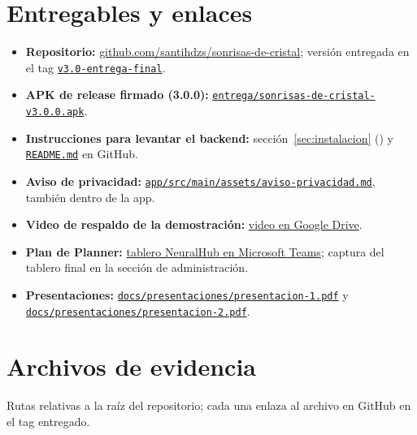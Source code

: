 \section{Entregables y enlaces}\label{sec:entregables}
\newcommand{\gh}{https://github.com/santihdzs/sonrisas-de-cristal}
\begin{itemize}
	\item \textbf{Repositorio:} \href{\gh}{github.com/santihdzs/sonrisas-de-cristal}; versión entregada en el tag \href{\gh/tree/v3.0-entrega-final}{\texttt{v3.0-entrega-final}}.
	\item \textbf{APK de release firmado (3.0.0):} \href{\gh/raw/v3.0-entrega-final/entrega/sonrisas-de-cristal-v3.0.0.apk}{\texttt{entrega/sonrisas-de-cristal-v3.0.0.apk}}.
	\item \textbf{Instrucciones para levantar el backend:} sección~\ref{sec:instalacion} () y \href{\gh/blob/v3.0-entrega-final/README.md}{\texttt{README.md}} en GitHub.
	\item \textbf{Aviso de privacidad:} \href{\gh/blob/v3.0-entrega-final/app/src/main/assets/aviso-privacidad.md}{\texttt{app/src/main/assets/aviso-privacidad.md}}, también dentro de la app.
	\item \textbf{Video de respaldo de la demostración:} \href{https://drive.google.com/file/d/12scqGtx0UNwZK7dzs1meVS2RLC9BJlBB/view?usp=sharing}{video en Google Drive}.
	\item \textbf{Plan de Planner:} \href{https://teams.microsoft.com/l/entity/com.microsoft.teamspace.tab.planner/_djb2_msteams_prefix_3923924113?context=\%7B\%22channelId\%22\%3A\%2219\%3A17zu_w8a-xo5ieToH61foRRfCKvnOu6HKuCw9bj4xts1\%40thread.tacv2\%22\%7D&tenantId=c65a3ea6-0f7c-400b-8934-5a6dc1705645}{tablero NeuralHub en Microsoft Teams}; captura del tablero final en la sección de administración.
	\item \textbf{Presentaciones:} \href{\gh/blob/v3.0-entrega-final/docs/presentaciones/presentacion-1.pdf}{\texttt{docs/presentaciones/presentacion-1.pdf}} y \href{\gh/blob/v3.0-entrega-final/docs/presentaciones/presentacion-2.pdf}{\texttt{docs/presentaciones/presentacion-2.pdf}}.
\end{itemize}

\appendix
\section{Archivos de evidencia}\label{sec:evidencia}
Rutas relativas a la raíz del repositorio; cada una enlaza al archivo en GitHub en el tag entregado.


